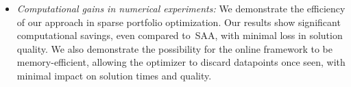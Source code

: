 \documentclass[12pt]{article}
\newcommand{\bnote}[1]{\textcolor{purple}{\textbf{[B: #1]}}}
\newcommand{\ie}{{\it i.e.}}
\begin{document}
\begin{itemize}
    \item {\it Computational gains in numerical experiments:} We demonstrate the efficiency of our approach in sparse portfolio optimization. Our results show significant computational savings, even compared to~\gls{SAA}, with minimal loss in solution quality.
    We also demonstrate the possibility for the online framework to be memory-efficient, allowing the optimizer to discard datapoints once seen, with minimal impact on solution times and quality.  

\end{itemize}

\end{document}
